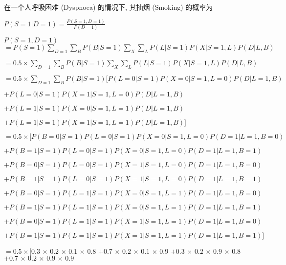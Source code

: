 \documentclass[UTF8]{ctexart}
\begin{document}







在一个人呼吸困难 (Dyspnoea) 的情况下, 其抽烟 (Smoking) 的概率为
\begin{center}
  $\displaystyle{P(S=1|D=1)=\frac{P(S=1,D=1)}{P(D=1)}}$\\
\end{center}

$P(S=1,D=1)$
$=P(S=1)\sum \limits_{D=1}\sum \limits_{B}P(B|S=1)
  \sum \limits_{X}\sum \limits_{L} P(L|S=1) P(X|S=1,L)  P(D|L,B)$

$=0.5×\sum \limits_{D=1}\sum \limits_{B}P(B|S=1)
  \sum \limits_{X}\sum \limits_{L} P(L|S=1) P(X|S=1,L)  P(D|L,B)$

$=0.5×\sum \limits_{D=1}\sum \limits_{B}P(B|S=1)
  [ P(L=0|S=1) P(X=0|S=1,L=0)  P(D|L=1,B)$

      $+P(L=0|S=1) P(X=1|S=1,L=0)  P(D|L=1,B)$

      $+P(L=1|S=1) P(X=0|S=1,L=1)  P(D|L=1,B)$

      $+P(L=1|S=1) P(X=1|S=1,L=1)  P(D|L=1,B)]$

$=0.5×[ P(B=0|S=1)P(L=0|S=1) P(X=0|S=1,L=0)  P(D=1|L=1,B=0)$

$+P(B=1|S=1)P(L=0|S=1) P(X=0|S=1,L=0)  P(D=1|L=1,B=1)$

$+P(B=0|S=1)P(L=0|S=1) P(X=1|S=1,L=0)  P(D=1|L=1,B=0)$

$+P(B=1|S=1)P(L=0|S=1) P(X=1|S=1,L=0)  P(D=1|L=1,B=1)$

$+P(B=0|S=1)P(L=1|S=1) P(X=0|S=1,L=1)  P(D=1|L=1,B=0)$

$+P(B=1|S=1)P(L=1|S=1) P(X=0|S=1,L=1)  P(D=1|L=1,B=1)$

$+P(B=0|S=1)P(L=1|S=1) P(X=1|S=1,L=1)  P(D=1|L=1,B=0)$

$+P(B=1|S=1)P(L=1|S=1) P(X=1|S=1,L=1)  P(D=1|L=1,B=1)]$

$=0.5×[0.3\,×\,0.2\,×\, 0.1\,×\,0.8$
$+0.7\,×\,0.2\,×\,0.1\,×\,0.9$
$+0.3\,×\,0.2\,×\,0.9 \,×\,0.8$
$+0.7\,×\,0.2\,×\,0.9 \,×\,0.9$
\end{document}
